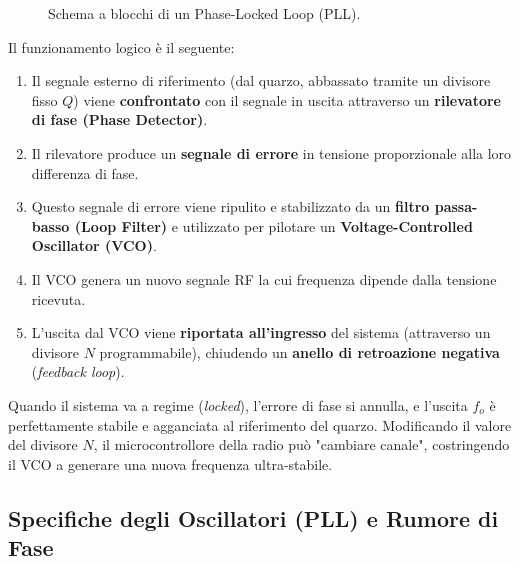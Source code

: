 \documentclass[openany,a4paper,12pt]{book}
\begin{document}
\begin{figure}[H]
{%
    }
    \caption*{Schema a blocchi di un Phase-Locked Loop (PLL).}
\end{figure}

Il funzionamento logico è il seguente:
\begin{enumerate}
    \item Il segnale esterno di riferimento (dal quarzo, abbassato tramite un divisore fisso $Q$) viene \textbf{confrontato} con il segnale in uscita attraverso un \textbf{rilevatore di fase (Phase Detector)}.
    \item Il rilevatore produce un \textbf{segnale di errore} in tensione proporzionale alla loro differenza di fase.
    \item Questo segnale di errore viene ripulito e stabilizzato da un \textbf{filtro passa-basso (Loop Filter)} e utilizzato per pilotare un \textbf{Voltage-Controlled Oscillator (VCO)}.
    \item Il VCO genera un nuovo segnale RF la cui frequenza dipende dalla tensione ricevuta.
    \item L'uscita dal VCO viene \textbf{riportata all'ingresso} del sistema (attraverso un divisore $N$ programmabile), chiudendo un \textbf{anello di retroazione negativa} (\textit{feedback loop}).
\end{enumerate}

Quando il sistema va a regime (\textit{locked}), l'errore di fase si annulla, e l'uscita $f_o$ è perfettamente stabile e agganciata al riferimento del quarzo. Modificando il valore del divisore $N$, il microcontrollore della radio può "cambiare canale", costringendo il VCO a generare una nuova frequenza ultra-stabile.

\subsection*{Specifiche degli Oscillatori (PLL) e Rumore di Fase}
\end{document}
